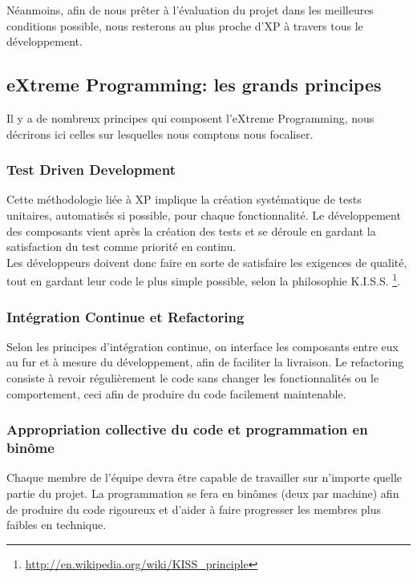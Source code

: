 \documentclass{../../res/univ-projet}
\begin{document}
	Néanmoins, afin de nous prêter à l'évaluation du projet dans les meilleures conditions possible, nous resterons au plus proche d'XP à travers tous le développement.
	

\subsection{eXtreme Programming: les grands principes}

Il y a de nombreux principes qui composent l'eXtreme Programming, nous décrirons ici celles sur lesquelles nous comptons nous focaliser.

	\subsubsection{Test Driven Development}
	
Cette méthodologie liée à XP implique la création systématique de tests unitaires, automatisés si possible, pour chaque fonctionnalité. Le développement des composants vient après la création des tests et se déroule en gardant la satisfaction du test comme priorité en continu.\\


Les développeurs doivent donc faire en sorte de satisfaire les exigences de qualité, tout en gardant leur code le plus simple possible, selon la philosophie K.I.S.S. \footnote{\href{http://en.wikipedia.org/wiki/KISS\_principle}{http://en.wikipedia.org/wiki/KISS\_principle}}.
	 
	 \subsubsection{Intégration Continue et Refactoring}
	 
Selon les principes d'intégration continue, on interface les composants entre eux au fur et à mesure du développement, afin de faciliter la livraison. Le refactoring  consiste à revoir régulièrement le code sans changer les fonctionnalités ou le comportement, ceci afin de produire du code facilement maintenable.

\subsubsection{Appropriation collective du code et programmation en binôme}

Chaque membre de l'équipe devra être capable de travailler sur n'importe quelle partie du projet. La programmation se fera en binômes (deux par machine) afin de produire du code rigoureux et d'aider à faire progresser les membres plus faibles en technique. \\
\end{document}
